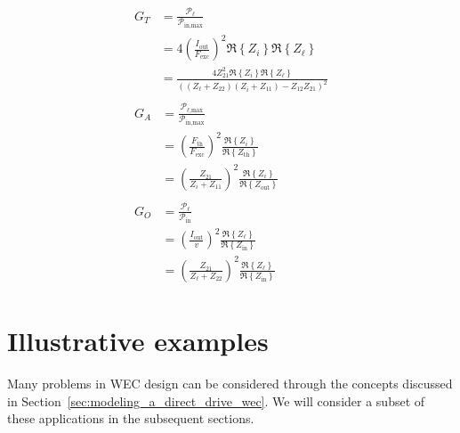 \documentclass[lettersize,journal]{IEEEtran}
\begin{document}
\begin{subequations}
\begin{align}
        \begin{split}
                G_T &= \frac{\mathcal{P}_\ell}{\mathcal{P}_{\textrm{in,max}}} \\
                &= 4\left(\frac{I_{\textrm{out}}}{F_{\textrm{exc}}}\right)^2\Re \left\{ Z_i \right\}\Re \left\{ Z_{\ell} \right\}  \\
                &= \frac{4 Z_{21}^2 \Re \left\{ Z_i \right\}\Re \left\{ Z_{\ell} \right\}}{((Z_{\ell} + Z_{22})(Z_i + Z_{11}) - Z_{12}Z_{21})^2} 
        \end{split}
        \label{eq:transducer_gain}
        \\[1em]
        \begin{split}
                G_A &= \frac{\mathcal{P}_{\ell\textrm{,max}}}{\mathcal{P}_{\textrm{in,max}}}  \\
                &= \left(\frac{F_{\textrm{th}}}{F_{\textrm{exc}}}\right)^2\frac{\Re \left\{ Z_i \right\}}{\Re \left\{ Z_{\textrm{th}} \right\}} \\
                &= \left(\frac{Z_{21}}{Z_i + Z_{11}}\right)^2\frac{\Re \left\{ Z_i \right\}}{\Re \left\{ Z_{\textrm{out}} \right\}}
        \end{split}
        \label{eq:available_gain}
        \\[1em]
        \begin{split}
                G_O &= \frac{\mathcal{P}_\ell}{\mathcal{P}_{\textrm{in}}}  \\
                &= \left(\frac{I_{\textrm{out}}}{v}\right)^2\frac{\Re \left\{ Z_{\ell} \right\}}{\Re \left\{ Z_{\textrm{in}} \right\}} \\
                &=  \left(\frac{Z_{21}}{Z_{\ell} + Z_{22}}\right)^2\frac{\Re \left\{ Z_{\ell} \right\}}{\Re \left\{ Z_{\textrm{in}} \right\}} 
        \end{split} \label{eq:operating_gain}
\end{align} \label{eq:gains}
\end{subequations}

\section{Illustrative examples}\label{sec:illustrative_examples}
Many problems in WEC design can be considered through the concepts discussed in Section~\ref{sec:modeling_a_direct_drive_wec}.
We will consider a subset of these applications in the subsequent sections.
\end{document}
